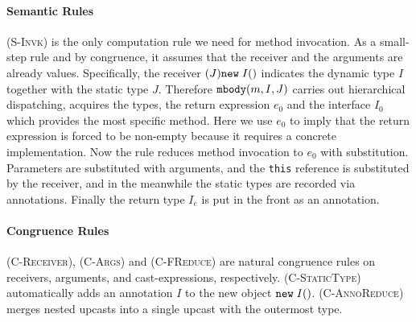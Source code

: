 \paragraph{Semantic Rules} \textsc{(S-Invk)} is the only computation rule we need for method invocation.
As a small-step rule and by congruence, it assumes that the receiver and the arguments are already values.
Specifically, the receiver $(J)\texttt{new} \; I()$ indicates the dynamic type $I$
together with the static type $J$. Therefore $\texttt{mbody}(m, I, J)$ carries out hierarchical dispatching, acquires
the types, the return expression $e_0$ and the interface $I_0$ which provides the most specific method.
Here we use $e_0$ to imply that the return expression is forced to be non-empty because it requires a concrete implementation. Now the
rule reduces method invocation to $e_0$ with substitution.
Parameters are substituted with arguments, and the \lstinline|this| reference is substituted by the receiver,
and in the meanwhile the static types are recorded via annotations. Finally the return type $I_e$ is put in the front as an annotation.
\paragraph{Congruence Rules} \textsc{(C-Receiver)}, \textsc{(C-Args)} and \textsc{(C-FReduce)} are natural congruence rules
on receivers, arguments, and cast-expressions, respectively. \textsc{(C-StaticType)} automatically adds an annotation $I$ to the new
object $\texttt{new} \; I()$. \textsc{(C-AnnoReduce)} merges nested upcasts into a single upcast with the outermost type.



\begin{comment}
\paragraph{Example} In contrast with the counter-example in Section~\ref{subsec:typingrules}, it is better to understand semantics by
well-compiled examples. Here we abstract a variant of the \lstinline|DrawableDeck| example:

\vspace{3pt}\begin{lstlisting}
interface Void       {}
interface JFrame     {}
interface Deck       { Void draw() override Deck { return new Void(); } }
interface Drawable { JFrame draw() override Drawable; }
interface DrawableDeck extends Drawable, Deck {
  JFrame draw() override Drawable {
    return new JFrame();
  }
}

((Drawable) new DrawableDeck()).draw()
\end{lstlisting}\vspace{3pt}
We put \lstinline|Drawable.draw| as an abstract method instead, but hierarchically override it in \lstinline|DrawableDeck|.
By typing rules, the code is well-compiled. And during runtime,
\begin{align*}
	& ((Drawable) new DrawableDeck()).draw() \\
\rightarrow & (JFrame) new JFrame()
\end{align*}
\end{comment}